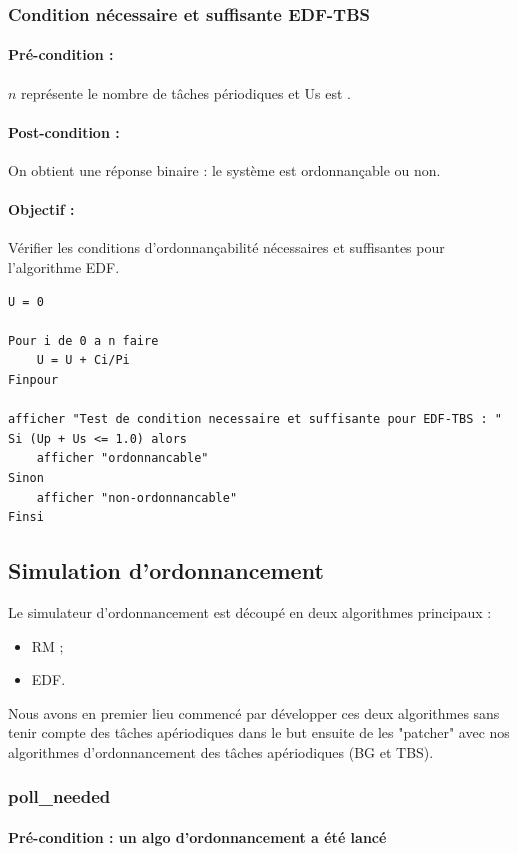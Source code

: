 			\subsubsection{Condition nécessaire et suffisante EDF-TBS}
				\paragraph{Pré-condition :} $n$ représente le nombre de tâches périodiques et Us est .
				\paragraph{Post-condition :} On obtient une réponse binaire : le système est ordonnançable ou non.
				\paragraph{Objectif :} Vérifier les conditions d'ordonnançabilité nécessaires et suffisantes pour l'algorithme EDF.
					\begin{lstlisting}
U = 0

Pour i de 0 a n faire
    U = U + Ci/Pi
Finpour
					
afficher "Test de condition necessaire et suffisante pour EDF-TBS : "
Si (Up + Us <= 1.0) alors
	afficher "ordonnancable"
Sinon
	afficher "non-ordonnancable"
Finsi
					\end{lstlisting}
	
		\subsection{Simulation d'ordonnancement}
			Le simulateur d'ordonnancement est découpé en deux algorithmes principaux :
			\begin{itemize}
				\item RM ;
				\item EDF.
			\end{itemize}
			
			Nous avons en premier lieu commencé par développer ces deux algorithmes sans tenir compte des tâches apériodiques dans le but ensuite de les "patcher" avec nos algorithmes d'ordonnancement des tâches apériodiques (BG et TBS).
			
			
			\subsubsection{poll\_needed}
				\paragraph{Pré-condition : un algo d'ordonnancement a été lancé} 
